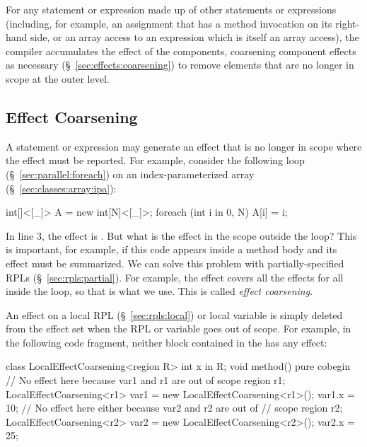  For any statement or
expression made up of other statements or expressions (including, for
example, an assignment that has a method invocation on its right-hand
side, or an array access to an expression which is itself an array
access), the compiler accumulates the effect of the components,
coarsening component effects as necessary
(\S~\ref{sec:effects:coarsening}) to remove elements that are no
longer in scope at the outer level.



\subsection{Effect Coarsening%
\label{sec:effects:coarsening}}

A statement or expression may generate an effect that is no longer in
scope where the effect must be reported.  For example, consider the
following  loop (\S~\ref{sec:parallel:foreach}) on an
index-parameterized array (\S~\ref{sec:classes:array:ipa}):
%
\begin{numbereddpjlisting}
int[]<[_]> A = new int[N]<[_]>;
foreach (int i in 0, N) {
    A[i] = i;
}
\end{numbereddpjlisting}
%
In line 3, the effect is .  But what is the effect in
the scope outside the loop?  This is important, for example, if this
code appears inside a method body and its effect must be summarized.
We can solve this problem with partially-specified RPLs
(\S~\ref{sec:rpls:partial}).  For example, the effect 
covers all the effects  for all  inside the
loop, so that is what we use.  This is called \emph{effect
  coarsening}.

 An effect on a local RPL
(\S~\ref{sec:rpls:local}) or local variable is simply deleted from the
effect set when the RPL or variable goes out of scope.  For example,
in the following code fragment, neither block contained in the
 has any effect:
%
\begin{dpjlisting}
class LocalEffectCoarsening<region R> {
    int x in R;
    void method() pure {
        cobegin {
            // No effect here because var1 and r1 are out of scope
            {
                region r1;
                LocalEffectCoarsening<r1> var1 = 
                    new LocalEffectCoarsening<r1>();
                var1.x = 10;
            }
            // No effect here either because var2 and r2 are out of
            // scope
            {
                region r2;
                LocalEffectCoarsening<r2> var2 =
                    new LocalEffectCoarsening<r2>();
                var2.x = 25;
            }
        }
    }    
}
\end{dpjlisting}

